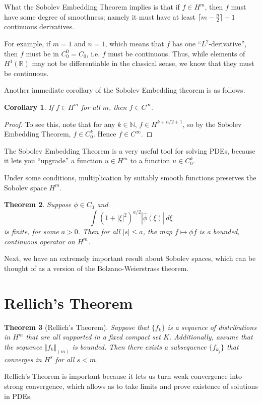 \documentclass[12pt,letterpaper,reqno]{article}
\theoremstyle{plain}                              %
\newtheorem{thm}{Theorem}[section]
\newtheorem{cor}[thm]{Corollary}
\theoremstyle{definition}                         %
\theoremstyle{remark}                             %
\numberwithin{equation}{section}
\newcommand{\R}{\mathbb{R}}                     %
\newcommand{\N}{\mathbb{N}}                     %
\begin{document}
What the Sobolev Embedding Theorem implies is that if $f\in H^m$, then $f$ must have some degree of smoothness; namely it must have at least $\lceil m-\frac n2 \rceil -1$ continuous derivatives.

For example, if $m=1$ and $n=1$, which means that $f$ has one ``$L^2$-derivative'', then $f$ must be in $C_0^0=C_0$, i.e. $f$ must be continuous. Thus, while elements of $H^1(\R)$ may not be differentiable in the classical sense, we know that they must be continuous. 

Another immediate corollary of the Sobolev Embedding theorem is as follows.
\begin{cor}\label{cor: infinite L2 differentiable implies Cinfty}
    If $f\in H^m$ for all $m$, then $f\in C^\infty$. 
\end{cor}
\begin{proof}
    To see this, note that for any $k\in \N$, $f\in H^{k+n/2+1}$, so by the Sobolev Embedding Theorem, $f\in C_0^k$. Hence $f\in C^\infty$.
\end{proof}
The Sobolev Embedding Theorem is a very useful tool for solving PDEs, because it lets you ``upgrade'' a function $u\in H^m$ to a function $u\in C_0^k$.


Under some conditions, multiplication by suitably smooth functions preserves the Sobolev space $H^m$.
\begin{thm}\label{thm: multiply by smooth functions}
    Suppose $\phi \in C_0$ and 
    \[\int (1+|\xi|^2)^{a/2} |\widehat{\phi}(\xi)| \, d\xi\]
    is finite, for some $a>0$. Then for all $|s|\le a$, the map $f\mapsto \phi f$ is a bounded, continuous operator on $H^m$.
\end{thm}

Next, we have an extremely important result about Sobolev spaces, which can be thought of as a version of the Bolzano-Weierstrass theorem. %

\section{Rellich's Theorem}

\begin{thm}[Rellich's Theorem]
    Suppose that $\{f_k\}$ is a sequence of distributions in $H^m$ that are all supported in a fixed compact set $K$. Additionally, assume that the sequence $\Vert f_k \Vert_{(m)}$ is bounded. Then there exists a subsequence $\{f_{k_j}\}$ that converges in $H^s$ for all $s<m$.
\end{thm}
Rellich's Theorem is important because it lets us turn weak convergence into strong convergence, which allows as to take limits and prove existence of solutions in PDEs.
\end{document}
